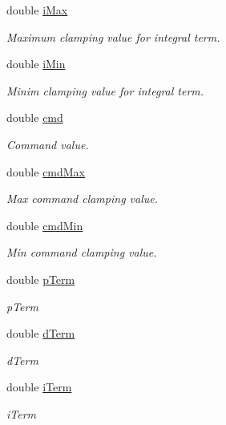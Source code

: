 \begin{DoxyCompactItemize}
double \hyperlink{classnubot_1_1PID_a23926b1473b7ad4cbbd9fb565b94712e}{i\-Max}
\begin{DoxyCompactList}\small\item\em Maximum clamping value for integral term. \end{DoxyCompactList}\item 
double \hyperlink{classnubot_1_1PID_aabd36c7c162217550544931b749e4a7e}{i\-Min}
\begin{DoxyCompactList}\small\item\em Minim clamping value for integral term. \end{DoxyCompactList}\item 
double \hyperlink{classnubot_1_1PID_a756c5fabaf2421e05302b93e9ef248a7}{cmd}
\begin{DoxyCompactList}\small\item\em Command value. \end{DoxyCompactList}\item 
double \hyperlink{classnubot_1_1PID_a2a4e5aac90ab72833c48b1f7f06313a6}{cmd\-Max}
\begin{DoxyCompactList}\small\item\em Max command clamping value. \end{DoxyCompactList}\item 
double \hyperlink{classnubot_1_1PID_a887cadc64650fbd326b05c081141603f}{cmd\-Min}
\begin{DoxyCompactList}\small\item\em Min command clamping value. \end{DoxyCompactList}\item 
double \hyperlink{classnubot_1_1PID_ac209a483d85ab0a198d36709dd0d089d}{p\-Term}
\begin{DoxyCompactList}\small\item\em p\-Term \end{DoxyCompactList}\item 
double \hyperlink{classnubot_1_1PID_a5b1af456567f8c17b81d4be70dbb1bb1}{d\-Term}
\begin{DoxyCompactList}\small\item\em d\-Term \end{DoxyCompactList}\item 
double \hyperlink{classnubot_1_1PID_ad05e98c72f5396f4bd32e729ede59ad1}{i\-Term}
\begin{DoxyCompactList}\small\item\em i\-Term \end{DoxyCompactList}\end{DoxyCompactItemize}


